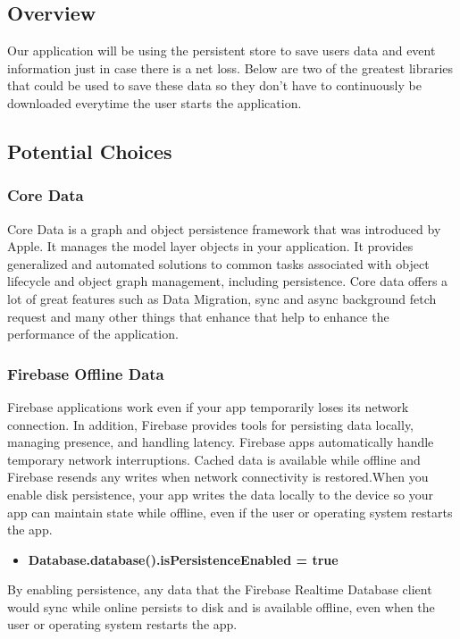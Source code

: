 \documentclass[onecolumn, draftclsnofoot,10pt, compsoc]{IEEEtran}
\begin{document}
\subsection{Overview}
Our application will be using the persistent store to save users data and event information just in case there is a net loss. Below are two of the greatest libraries that could be used to save these data so they don't have to continuously be downloaded everytime the user starts the application.

\subsection{Potential Choices}
\subsubsection{Core Data\cite{CoreData}}
\par Core Data is a graph and object persistence framework that was introduced by Apple. It manages the model layer objects in your application. It provides generalized and automated solutions to common tasks associated with object lifecycle and object graph management, including persistence. Core data offers a lot of great features such as Data Migration, sync and async background fetch request and many other things that enhance that help to enhance the performance of the application.

\subsubsection{Firebase Offline Data\cite{Firebase}}
\par Firebase applications work even if your app temporarily loses its network connection. In addition, Firebase provides tools for persisting data locally, managing presence, and handling latency. Firebase apps automatically handle temporary network interruptions. Cached data is available while offline and Firebase resends any writes when network connectivity is restored.When you enable disk persistence, your app writes the data locally to the device so your app can maintain state while offline, even if the user or operating system restarts the app.
\begin{itemize}
\item \textbf{Database.database().isPersistenceEnabled = true}
\end{itemize}
By enabling persistence, any data that the Firebase Realtime Database client would sync while online persists to disk and is available offline, even when the user or operating system restarts the app.
\end{document}
